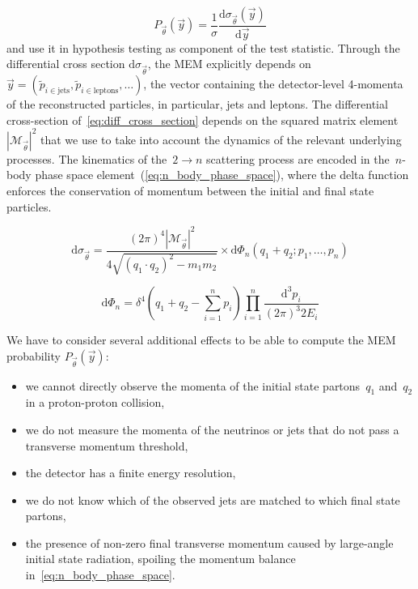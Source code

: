 \begin{equation}
P_{\vec{\theta}}(\vec{y}) = \frac{1}{\sigma}
\frac{\mathrm{d}\sigma_{\vec{\theta}}(\vec{y})}{\mathrm{d}\vec{y}}
\end{equation}
and use it in hypothesis testing as component of the test statistic. Through the differential cross section $\mathrm{d}\sigma_{\vec{\theta}}$, the MEM explicitly depends on~$\vec{y} = (\tilde{p}_{i \in \mathrm{jets}}, \tilde{p}_{i \in \mathrm{leptons}}, \dots)$, the vector containing the detector-level 4-momenta of the reconstructed particles, in particular, jets and leptons. The differential cross-section of~\cref{eq:diff_cross_section} depends on the squared matrix element~$|\mathcal{M}_{\vec{\theta}}|^2$ that we use to take into account the dynamics of the relevant underlying processes. The kinematics of the~$2 \rightarrow n$ scattering process are encoded in the~$n$-body phase space element~(\cref{eq:n_body_phase_space}), where the delta function enforces the conservation of momentum between the initial and final state particles.

\begin{equation}
\label{eq:diff_cross_section}
\mathrm{d}\sigma_{\vec{\theta}} = \frac{(2\pi)^4 |\mathcal{M}_{\vec{\theta}}|^2}{4 \sqrt{(q_1 \cdot q_2)^2 - m_1 m_2}} \times
\mathrm{d}\Phi_n(q_1 + q_2; p_1, \dots, p_{n})
\end{equation}

\begin{equation}
\label{eq:n_body_phase_space}
\mathrm{d}\Phi_n = \delta^4 (q_1 + q_2 - \sum_{i=1}^n p_i) \prod_{i=1}^n \frac{\mathrm{d}^3 p_i}{(2\pi)^3 2 E_i}
\end{equation}

We have to consider several additional effects to be able to compute the MEM probability $P_{\vec{\theta}}(\vec{y})$:
\begin{itemize}
\item we cannot directly observe the momenta of the initial state partons~$q_1$ and~$q_2$ in a proton-proton collision,
\item we do not measure the momenta of the neutrinos or jets that do not pass a transverse momentum threshold,
\item the detector has a finite energy resolution,
\item we do not know which of the observed jets are matched to which final state partons,
\item the presence of non-zero final transverse momentum caused by large-angle initial state radiation, spoiling the momentum balance in~\cref{eq:n_body_phase_space}.
\end{itemize}

